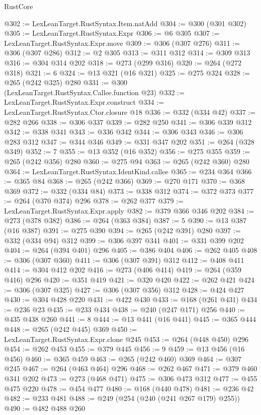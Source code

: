 \begin{lexlean}{RustCore}
\begin{coremodule}
@302 := LexLeanTarget.RustSyntax.Item.natAdd
@304 := @300 (@301 @302)
@305 := LexLeanTarget.RustSyntax.Expr
@306 := @6 @305
@307 := LexLeanTarget.RustSyntax.Expr.move
@309 := @306 (@307 @276)
@311 := @306 (@307 @286)
@312 := @2 @305
@313 := @311 @312
@314 := @309 @313
@316 := @304 @314 @202
@318 := @273 (@299 @316)
@320 := @264 (@272 @318)
@321 := 6
@324 := @13 @321 (@16 @321)
@325 := @275 @324
@328 := @265 (@242 @325) @280
@331 := @300 (LexLeanTarget.RustSyntax.Callee.function @23)
@332 := LexLeanTarget.RustSyntax.Expr.construct
@334 := LexLeanTarget.RustSyntax.Ctor.closure @18
@336 := @332 (@334 @42)
@337 := @282 @266
@338 := @306 @337
@339 := @282 @250
@341 := @306 @339 @312
@342 := @338 @341
@343 := @336 @342
@344 := @306 @343
@346 := @306 @283 @312
@347 := @344 @346
@349 := @331 @347 @202
@351 := @264 (@328 @349)
@352 := 7
@355 := @13 @352 (@16 @352)
@356 := @275 @355
@359 := @265 (@242 @356) @280
@360 := @275 @94
@363 := @265 (@242 @360) @280
@364 := LexLeanTarget.RustSyntax.IdentKind.callee
@365 := @234 @364
@366 := @365 @84
@368 := @265 (@242 @366)
@369 := @270 @171
@370 := @368 @369
@372 := @332 (@334 @84)
@373 := @338 @312
@374 := @372 @373
@377 := @264 (@370 @374) @296
@378 := @262 @377
@379 := LexLeanTarget.RustSyntax.Expr.apply
@382 := @379 @366 @346 @202
@384 := @273 (@378 @382)
@386 := @264 (@363 @384)
@387 := 5
@390 := @13 @387 (@16 @387)
@391 := @275 @390
@394 := @265 (@242 @391) @280
@397 := @332 (@334 @94) @312
@399 := @306 @397 @341
@401 := @331 @399 @202
@404 := @264 (@394 @401) @296
@405 := @386 @404
@406 := @262 @405
@408 := @306 (@307 @360)
@411 := @306 (@307 @391) @312
@412 := @408 @411
@414 := @304 @412 @202
@416 := @273 (@406 @414)
@419 := @264 (@359 @416) @296
@420 := @351 @419
@421 := @320 @420
@422 := @262 @421
@424 := @306 (@307 @325)
@427 := @306 (@307 @356) @312
@428 := @424 @427
@430 := @304 @428 @220
@431 := @422 @430
@433 := @168 (@261 @431)
@434 := @236 @23
@435 := @233 @434
@438 := @240 (@247 @171) @256
@440 := @435 @438 @260
@441 := 8
@444 := @13 @441 (@16 @441)
@445 := @365 @444
@448 := @265 (@242 @445) @369
@450 := LexLeanTarget.RustSyntax.Expr.clone @245
@453 := @264 (@448 @450) @296
@454 := @262 @453
@455 := @379 @445
@456 := 9
@459 := @13 @456 (@16 @456)
@460 := @365 @459
@463 := @265 (@242 @460) @369
@464 := @307 @245
@467 := @264 (@463 @464) @296
@468 := @262 @467
@471 := @379 @460 @341 @202
@473 := @273 (@468 @471)
@475 := @306 @473 @312
@477 := @455 @475 @220
@478 := @454 @477
@480 := @168 (@440 @478)
@481 := @236 @42
@482 := @233 @481
@488 := @249 (@254 (@240 (@241 @267 @179) @255))
@490 := @482 @488 @260

\end{coremodule}
\end{lexlean}
